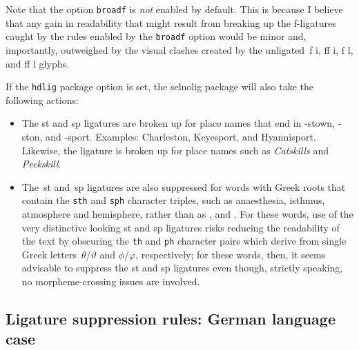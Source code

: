 \documentclass[11pt]{article}
\newcommand{\pkg}[1]{\textsf{#1}}
\newcommand{\opt}[1]{\texttt{#1}}
\begin{document}
Note that the option \opt{broadf} is \emph{not} enabled by default. This is because I believe that any gain in readability that might result from breaking up the f-ligatures caught by the rules enabled by the \opt{broadf} option would be minor and, importantly, outweighed by the visual clashes created by the unligated~f\kern0pt i, ff\kern0pt i, f\kern0pt l, and ff\kern0pt l glyphs.

If the \opt{hdlig} package option is set, the \pkg{selnolig} package will also take the following actions:
\begin{itemize}
\item The st and sp ligatures are broken up for place names that end in -stown, -ston, and -sport. Examples: Charleston, Keyesport, and Hyannisport. Likewise, the \emph{} ligature is broken up for place names such as \emph{\ebg Catskills} and \emph{\ebg Peekskill}.

\item The~st and~sp ligatures are also suppressed for words with Greek roots that contain the \opt{sth} and \opt{sph} character triples, such as anaesthesia, isthmus, atmosphere and hemisphere, rather than as ,  and . For these words, use of the very distinctive looking st and sp ligatures risks reducing the readability of the text by obscuring the \opt{th} and \opt{ph} character pairs which derive from single Greek letters~$\theta$/$\vartheta$ and $\phi$/$\varphi$, respectively; for these words, then, it seems advisable to suppress the st and sp ligatures even though, strictly speaking, no morpheme-crossing issues are involved. 

\end{itemize}

\subsection{Ligature suppression rules: German language case}
\end{document}
